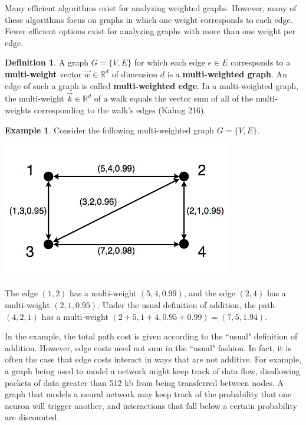 \documentclass[12pt]{amsart}
\theoremstyle{definition}
\newtheorem{definition}[thm]{Definition}
\newtheorem{example}[thm]{Example}
\theoremstyle{remark}
\numberwithin{equation}{section}
\newcommand{\R}{\mathbb{R}}
\begin{document}
Many efficient algorithms exist for analyzing weighted graphs. However, many of these algorithms focus on graphs in which one weight corresponds to each edge. Fewer efficient options exist for analyzing graphs with more than one weight per edge.

\begin{definition}
A graph $G = \{V,E\}$ for which each edge $e \in E$ corresponds to a \textbf{multi-weight} vector $\vec{w} \in \R^d$ of dimension $d$ is a \textbf{multi-weighted graph}. An edge of such a graph is called \textbf{multi-weighted edge}. In a multi-weighted graph, the multi-weight $\vec{k} \in \R^d$ of a walk equals the vector sum of all of the multi-weights corresponding to the walk's edges (Kahng 216).
\end{definition}

\begin{example}
Consider the following multi-weighted graph $G = \{V,E\}$.

\begin{center}\includegraphics[width=10cm]{figure-4-5-6.png}\end{center}

The edge $(1,2)$ has a multi-weight $(5, 4, 0.99)$, and the edge $(2,4)$ has a multi-weight $(2,1,0.95)$. Under the usual definition of addition, the path $(4,2,1)$ has a multi-weight $(2+5, 1+4, 0.95+0.99) = (7, 5, 1.94)$. 
\end{example}

In the example, the total path cost is given according to the ``usual" definition of addition. However, edge costs need not sum in the ``usual" fashion. In fact, it is often the case that edge costs interact in ways that are not additive. For example, a graph being used to model a network might keep track of data flow, disallowing packets of data greater than 512 kb from being transferred between nodes. A graph that models a neural network may keep track of the probability that one neuron will trigger another, and interactions that fall below a certain probability are discounted.
\end{document}
